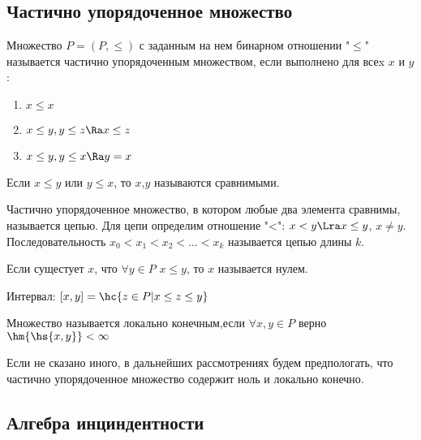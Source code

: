 \documentclass[unicode,10pt]{article}
\begin{document}
\subsection{Частично упорядоченное множество}
\begin{df}
  Множество $P=(P,\le)$ с заданным на нем бинарном отношении "$\le$" называется частично
  упорядоченным множеством, если выполнено для всеx $x$ и $y$:
  \begin{enumerate}
    \item $\displaystyle x\le x$
    \item $x\le y, y\le z \Ra x\le z$
    \item $x\le y, y\le x \Ra y=x$
  \end{enumerate}
\end{df}
\begin{df}
  Если $x\le y$ или $y\le x$, то $x$,$y$ называются сравнимыми.
\end{df}
\begin{df}
  Частично упорядоченное множество, в котором любые два элемента сравнимы, называется цепью.
  Для цепи определим отношение "<": $x<y \Lra x\le y$, $x\neq y$.
  Последовательность $\displaystyle x_0 < x_1 < x_2 < \dots <x_k$ называется цепью длины $k$.
\end{df}
\begin{df}
  Если сущестует $x$, что $\forall y\in P$ $x\le y$, то $x$ называется нулем.
\end{df}
\begin{df}
  Интервал: $[x,y] = \hc{z\in P | x\le z\le y}$
\end{df}
\begin{df}
  Множество называется локально конечным,\linebreak  если $\forall x,y\in P$ верно $\hm{\hs{x,y}}<\infty$
\end{df}
\begin{note}
Если не сказано иного, в дальнейших рассмотрениях будем предпологать,
что частично упорядоченное множество содержит ноль и локально конечно.
\end{note}
\subsection{Алгебра инциндентности}
\end{document}
